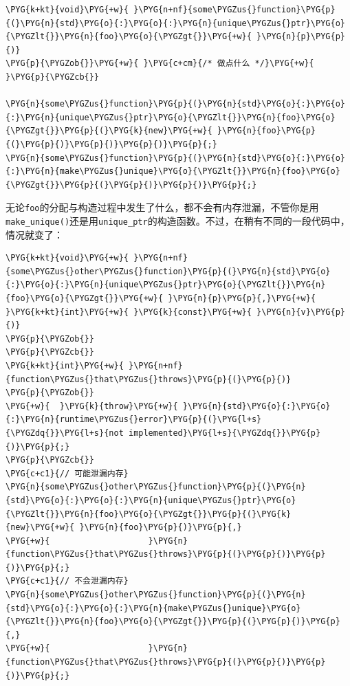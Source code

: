 
\begin{codeblockbg}
\begin{Verbatim}[commandchars=\\\{\},breaklines=true,breakanywhere=true,fontsize=\codefont,xleftmargin=17bp]
\PYG{k+kt}{void}\PYG{+w}{ }\PYG{n+nf}{some\PYGZus{}function}\PYG{p}{(}\PYG{n}{std}\PYG{o}{:}\PYG{o}{:}\PYG{n}{unique\PYGZus{}ptr}\PYG{o}{\PYGZlt{}}\PYG{n}{foo}\PYG{o}{\PYGZgt{}}\PYG{+w}{ }\PYG{n}{p}\PYG{p}{)}
\PYG{p}{\PYGZob{}}\PYG{+w}{ }\PYG{c+cm}{/* 做点什么 */}\PYG{+w}{ }\PYG{p}{\PYGZcb{}}

\PYG{n}{some\PYGZus{}function}\PYG{p}{(}\PYG{n}{std}\PYG{o}{:}\PYG{o}{:}\PYG{n}{unique\PYGZus{}ptr}\PYG{o}{\PYGZlt{}}\PYG{n}{foo}\PYG{o}{\PYGZgt{}}\PYG{p}{(}\PYG{k}{new}\PYG{+w}{ }\PYG{n}{foo}\PYG{p}{(}\PYG{p}{)}\PYG{p}{)}\PYG{p}{)}\PYG{p}{;}
\PYG{n}{some\PYGZus{}function}\PYG{p}{(}\PYG{n}{std}\PYG{o}{:}\PYG{o}{:}\PYG{n}{make\PYGZus{}unique}\PYG{o}{\PYGZlt{}}\PYG{n}{foo}\PYG{o}{\PYGZgt{}}\PYG{p}{(}\PYG{p}{)}\PYG{p}{)}\PYG{p}{;}
\end{Verbatim}
\end{codeblockbg}



无论\texttt{foo}的分配与构造过程中发生了什么，都不会有内存泄漏，不管你是用\texttt{make\_\allowbreak{}unique()}还是用\texttt{unique\_\allowbreak{}ptr}的构造函数。不过，在稍有不同的一段代码中，情况就变了：



\begin{codeblockbg}
\begin{Verbatim}[commandchars=\\\{\},breaklines=true,breakanywhere=true,fontsize=\codefont,xleftmargin=17bp]
\PYG{k+kt}{void}\PYG{+w}{ }\PYG{n+nf}{some\PYGZus{}other\PYGZus{}function}\PYG{p}{(}\PYG{n}{std}\PYG{o}{:}\PYG{o}{:}\PYG{n}{unique\PYGZus{}ptr}\PYG{o}{\PYGZlt{}}\PYG{n}{foo}\PYG{o}{\PYGZgt{}}\PYG{+w}{ }\PYG{n}{p}\PYG{p}{,}\PYG{+w}{ }\PYG{k+kt}{int}\PYG{+w}{ }\PYG{k}{const}\PYG{+w}{ }\PYG{n}{v}\PYG{p}{)}
\PYG{p}{\PYGZob{}}
\PYG{p}{\PYGZcb{}}
\PYG{k+kt}{int}\PYG{+w}{ }\PYG{n+nf}{function\PYGZus{}that\PYGZus{}throws}\PYG{p}{(}\PYG{p}{)}
\PYG{p}{\PYGZob{}}
\PYG{+w}{  }\PYG{k}{throw}\PYG{+w}{ }\PYG{n}{std}\PYG{o}{:}\PYG{o}{:}\PYG{n}{runtime\PYGZus{}error}\PYG{p}{(}\PYG{l+s}{\PYGZdq{}}\PYG{l+s}{not implemented}\PYG{l+s}{\PYGZdq{}}\PYG{p}{)}\PYG{p}{;}
\PYG{p}{\PYGZcb{}}
\PYG{c+c1}{// 可能泄漏内存}
\PYG{n}{some\PYGZus{}other\PYGZus{}function}\PYG{p}{(}\PYG{n}{std}\PYG{o}{:}\PYG{o}{:}\PYG{n}{unique\PYGZus{}ptr}\PYG{o}{\PYGZlt{}}\PYG{n}{foo}\PYG{o}{\PYGZgt{}}\PYG{p}{(}\PYG{k}{new}\PYG{+w}{ }\PYG{n}{foo}\PYG{p}{)}\PYG{p}{,}
\PYG{+w}{                    }\PYG{n}{function\PYGZus{}that\PYGZus{}throws}\PYG{p}{(}\PYG{p}{)}\PYG{p}{)}\PYG{p}{;}
\PYG{c+c1}{// 不会泄漏内存}
\PYG{n}{some\PYGZus{}other\PYGZus{}function}\PYG{p}{(}\PYG{n}{std}\PYG{o}{:}\PYG{o}{:}\PYG{n}{make\PYGZus{}unique}\PYG{o}{\PYGZlt{}}\PYG{n}{foo}\PYG{o}{\PYGZgt{}}\PYG{p}{(}\PYG{p}{)}\PYG{p}{,}
\PYG{+w}{                    }\PYG{n}{function\PYGZus{}that\PYGZus{}throws}\PYG{p}{(}\PYG{p}{)}\PYG{p}{)}\PYG{p}{;}
\end{Verbatim}
\end{codeblockbg}


